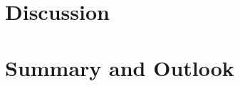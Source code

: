 \chapter{Discussion}
\label{cha:discussion}

\chapter{Summary and Outlook}
\label{cha:summary_and_outlook}
